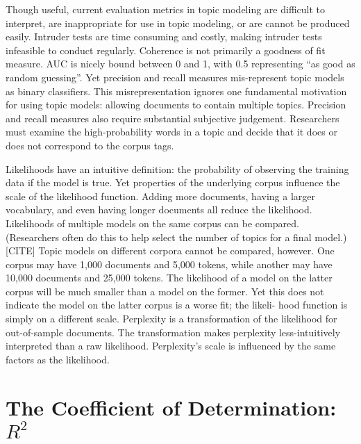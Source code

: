 \documentclass[conference,final,]{IEEEtran}
\begin{document}
Though useful, current evaluation metrics in topic modeling are
difficult to interpret, are inappropriate for use in topic modeling, or
are cannot be produced easily. Intruder tests are time consuming and
costly, making intruder tests infeasible to conduct regularly. Coherence
is not primarily a goodness of fit measure. AUC is nicely bound between
0 and 1, with 0.5 representing ``as good as random guessing''. Yet
precision and recall measures mis-represent topic models as binary
classifiers. This misrepresentation ignores one fundamental motivation
for using topic models: allowing documents to contain multiple topics.
Precision and recall measures also require substantial subjective
judgement. Researchers must examine the high-probability words in a
topic and decide that it does or does not correspond to the corpus tags.

Likelihoods have an intuitive definition: the probability of observing
the training data if the model is true. Yet properties of the underlying
corpus influence the scale of the likelihood function. Adding more
documents, having a larger vocabulary, and even having longer documents
all reduce the likelihood. Likelihoods of multiple models on the same
corpus can be compared. (Researchers often do this to help select the
number of topics for a final model.){[}CITE{]} Topic models on different
corpora cannot be compared, however. One corpus may have 1,000 documents
and 5,000 tokens, while another may have 10,000 documents and 25,000
tokens. The likelihood of a model on the latter corpus will be much
smaller than a model on the former. Yet this does not indicate the model
on the latter corpus is a worse fit; the likeli- hood function is simply
on a different scale. Perplexity is a transformation of the likelihood
for out-of-sample documents. The transformation makes perplexity
less-intuitively interpreted than a raw likelihood. Perplexity's scale
is influenced by the same factors as the likelihood.

\hypertarget{the-coefficient-of-determination-r2}{%
\section{\texorpdfstring{The Coefficient of Determination:
\(R^2\)}{The Coefficient of Determination: R\^{}2}}\label{the-coefficient-of-determination-r2}}
\end{document}
